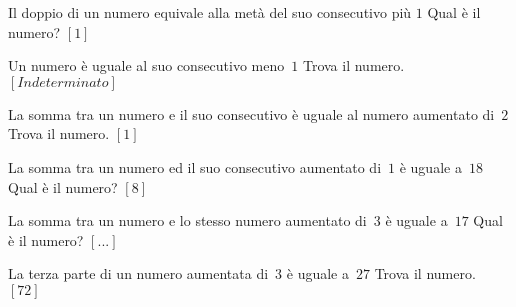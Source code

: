 \begin{multicols}{2}
\begin{esercizio}[\Ast]
\label{ese:14.15}
Il doppio di un numero equivale alla metà del suo consecutivo più \(1\) Qual è il 
numero? \hfill \(\left[1\right]\)
\end{esercizio}

\begin{esercizio}[\Ast]
\label{ese:14.16}
Un numero è uguale al suo consecutivo meno~\(1\) Trova il numero. 
\hfill \(\left[Indeterminato\right]\)
\end{esercizio}

\begin{esercizio}[\Ast]
\label{ese:14.17}
La somma tra un numero e il suo consecutivo è uguale al numero aumentato di~\(2\) 
Trova il numero. \hfill \(\left[1\right]\)
\end{esercizio}

\begin{esercizio}[\Ast]
\label{ese:14.18}
La somma tra un numero ed il suo consecutivo aumentato di~\(1\) è uguale a~\(18\) 
Qual è il numero? \hfill \(\left[8\right]\)
\end{esercizio}

\begin{esercizio}
\label{ese:14.19}
La somma tra un numero e lo stesso numero aumentato di~\(3\) è uguale a~\(17\) Qual 
è il numero? \hfill \(\left[...\right]\)
\end{esercizio}

\begin{esercizio}[\Ast]
\label{ese:14.20}
La terza parte di un numero aumentata di~\(3\) è uguale a~\(27\) Trova il numero. 
\hfill \(\left[72\right]\)
\end{esercizio}


\end{multicols}
